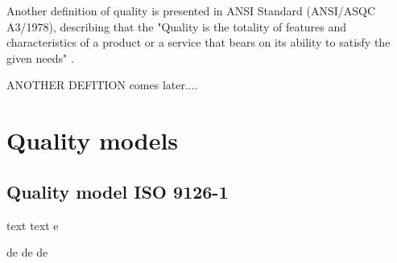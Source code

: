 Another definition of quality is presented in ANSI Standard (ANSI/ASQC A3/1978), describing that the "Quality is the totality of features and characteristics of a product or a service that bears on its ability to satisfy the given needs"  \citet{fitzpatrick1996software}.

ANOTHER DEFITION comes later....

\section{Quality models}

\subsection{Quality model ISO 9126-1}
text text
e

de
de
de

